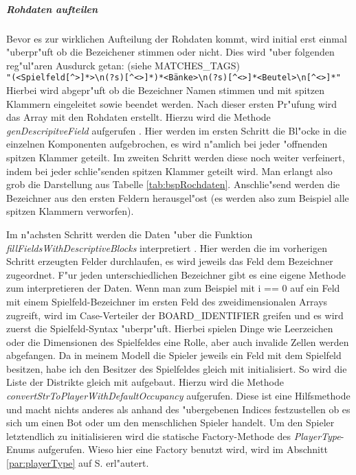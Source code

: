 \subparagraph{Rohdaten aufteilen}
\label{spar:converter_ablauf}
Bevor es zur wirklichen Aufteilung der Rohdaten kommt, wird initial erst einmal "uberpr"uft ob die Bezeichener stimmen oder nicht. Dies wird "uber folgenden reg"ul"aren Ausdurck getan: (siehe MATCHES\_TAGS)
\\ \verb|"(<Spielfeld[^>]*>\n(?s)[^<>]*)*<Bänke>\n(?s)[^<>]*<Beutel>\n[^<>]*"|
\\ Hierbei wird abgepr"uft ob die Bezeichner Namen stimmen und mit spitzen Klammern eingeleitet sowie beendet werden. Nach dieser ersten Pr"ufung wird das Array mit den Rohdaten erstellt. Hierzu wird die Methode \emph{genDescripitveField} aufgerufen . Hier werden im ersten Schritt die Bl"ocke in die einzelnen Komponenten aufgebrochen, es wird n"amlich bei jeder "offnenden spitzen Klammer geteilt. Im zweiten Schritt werden diese noch weiter verfeinert, indem bei jeder schlie"senden spitzen Klammer geteilt wird. Man erlangt also grob die Darstellung aus Tabelle \ref{tab:bspRochdaten}. Anschlie"send werden die Bezeichner aus den ersten Feldern herausgel"ost (es werden also zum Beispiel alle spitzen Klammern verworfen).

Im n"achsten Schritt werden die Daten "uber die Funktion \emph{fillFieldsWithDescriptiveBlocks} interpretiert . Hier werden die im vorherigen Schritt erzeugten Felder durchlaufen, es wird jeweils das Feld dem Bezeichner zugeordnet. F"ur jeden unterschiedlichen Bezeichner gibt es eine eigene Methode zum interpretieren der Daten. Wenn man zum Beispiel mit i == 0 auf ein Feld mit einem Spielfeld-Bezeichner im ersten Feld des zweidimensionalen Arrays zugreift, wird im Case-Verteiler der BOARD\_IDENTIFIER greifen und es wird zuerst die Spielfeld-Syntax "uberpr"uft. Hierbei spielen Dinge wie Leerzeichen oder die Dimensionen des Spielfeldes eine Rolle, aber auch invalide Zellen werden abgefangen. Da in meinem Modell die Spieler jeweils ein Feld mit dem Spielfeld besitzen, habe ich den Besitzer des Spielfeldes gleich mit initialisiert. So wird die Liste der Distrikte gleich mit aufgebaut. Hierzu wird die Methode \emph{convertStrToPlayerWithDefaultOccupancy} aufgerufen. Diese ist eine Hilfsmethode und macht nichts anderes als anhand des "ubergebenen Indices festzustellen ob es sich um einen Bot oder um den menschlichen Spieler handelt. Um den Spieler letztendlich zu initialisieren wird die statische Factory-Methode des \emph{PlayerType}-Enums aufgerufen. Wieso hier eine Factory benutzt wird, wird im Abschnitt \ref{par:playerType} auf S. \pageref{par:playerType} erl"autert. 

